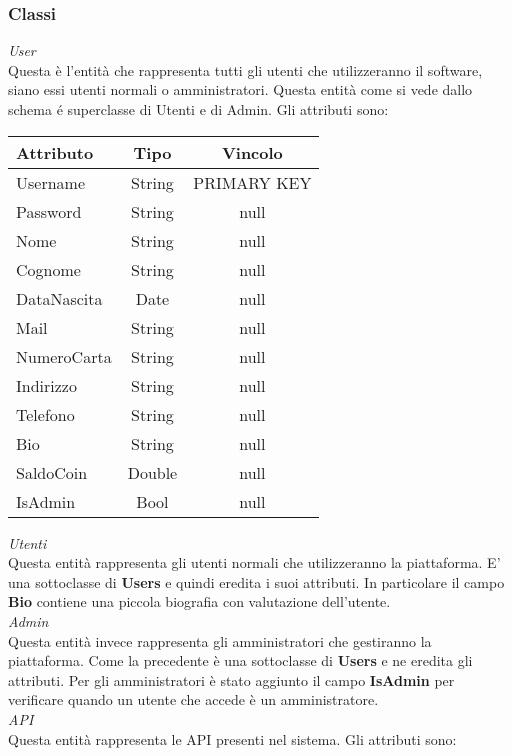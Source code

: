 {{			\subsubsection{Classi}
			\textit{User}\\
			Questa è l'entità che rappresenta tutti gli utenti che utilizzeranno il software, siano essi utenti normali o amministratori. Questa entità come si vede dallo schema é superclasse di Utenti e di Admin. Gli attributi sono: 
			\begin{center}
			\renewcommand\arraystretch{1.2} \begin{tabular}{lcc}
				\textbf{Attributo}&\textbf{Tipo}&\textbf{Vincolo}\\ \hline
				Username&String&PRIMARY KEY\\
				Password&String&null\\
				Nome&String&null \\
				Cognome&String&null \\
				DataNascita&Date&null\\
				Mail&String&null \\
				NumeroCarta&String&null \\
				Indirizzo&String&null \\
				Telefono&String&null \\
				Bio&String&null \\
				SaldoCoin&Double&null \\
				IsAdmin&Bool&null\\
			\end{tabular}
			\end{center}
			\textit{Utenti}\\
			Questa entità rappresenta gli utenti normali che utilizzeranno la piattaforma. E' una sottoclasse di \textbf{Users} e quindi eredita i suoi attributi. In particolare il campo \textbf{Bio} contiene una piccola biografia con valutazione dell'utente.  \\
			\textit{Admin}\\
			Questa entità invece rappresenta gli amministratori che gestiranno la piattaforma. Come la precedente è una sottoclasse di \textbf{Users} e ne eredita gli attributi. Per gli amministratori è stato aggiunto il campo \textbf{IsAdmin} per verificare quando un utente che accede è un amministratore. \\
			\textit{API}\\
			Questa entità rappresenta le API presenti nel sistema. Gli attributi sono:
			\begin{center}

\end{center}}}
